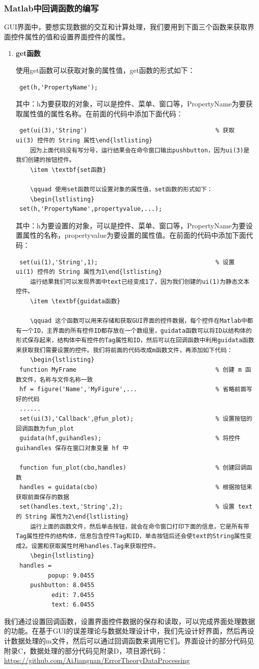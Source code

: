 \subsubsection{Matlab中回调函数的编写}
GUI界面中，要想实现数据的交互和计算处理，我们要用到下面三个函数来获取界面控件属性的值和设置界面控件的属性。
\begin{enumerate}
	\item \textbf{get函数}

	\qquad 使用get函数可以获取对象的属性值，get函数的形式如下：
	\begin{lstlisting}
 get(h,'PropertyName');\end{lstlisting}
 	其中：h为要获取的对象，可以是控件、菜单、窗口等，PropertyName为要获取属性值的属性名称。在前面的代码中添加下面代码：
	 \begin{lstlisting}
 get(ui(3),'String')									% 获取 ui(3) 控件的 String 属性\end{lstlisting}
 	因为上面代码没有写分号，运行结果会在命令窗口输出pushbutton，因为ui(3)是我们创建的按钮控件。
	\item \textbf{set函数}

	\qquad 使用set函数可以设置对象的属性值，set函数的形式如下：
	\begin{lstlisting}
 set(h,'PropertyName',propertyvalue,...);\end{lstlisting}
 	其中：h为要设置的对象，可以是控件、菜单、窗口等，PropertyName为要设置属性的名称，propertyvalue为要设置的属性值。在前面的代码中添加下面代码：
	 \begin{lstlisting}
 set(ui(1),'String',1);									% 设置 ui(1) 控件的 String 属性为1\end{lstlisting}
 	运行结果我们可以发现界面中text已经变成1了，因为我们创建的ui(1)为静态文本控件。
	\item \textbf{guidata函数}

	\qquad 这个函数可以用来存储和获取GUI界面的控件数据，每个控件在Matlab中都有一个ID，主界面的所有控件ID都存放在一个数组里，guidata函数可以将ID以结构体的形式保存起来，结构体中有控件的Tag属性和ID，然后可以在回调函数中利用guidata函数来获取我们需要设置的控件。我们将前面的代码改成m函数文件，再添加如下代码：
	\begin{lstlisting}
 function MyFrame										% 创建 m 函数文件，名称与文件名称一致
 hf = figure('Name','MyFigure',...						% 省略前面写好的代码
 ......
 set(ui(3),'Callback',@fun_plot);						% 设置按钮的回调函数为fun_plot
 guidata(hf,guihandles);								% 将控件 guihandles 保存在窗口对象变量 hf 中

 function fun_plot(cbo,handles)							% 创建回调函数
 handles = guidata(cbo)									% 根据按钮来获取前面保存的数据
 set(handles.text,'String',2);							% 设置 text 的 String 属性为2\end{lstlisting}
 	运行上面的函数文件，然后单击按钮，就会在命令窗口打印下面的信息，它是所有带Tag属性控件的结构体，信息包含控件Tag和ID，单击按钮后还会使text的String属性变成2。设置和获取属性时用handles.Tag来获取控件。
	\begin{lstlisting}
 handles = 
         popup: 9.0455
    pushbutton: 8.0455
          edit: 7.0455
          text: 6.0455\end{lstlisting}
\end{enumerate}

我们通过设置回调函数，设置界面控件数据的保存和读取，可以完成界面处理数据的功能。在基于GUI的误差理论与数据处理设计中，我们先设计好界面，然后再设计数据处理的m文件，然后可以通过回调函数来调用它们。界面设计的部分代码见附录C，数据处理的部分代码见附录D，项目源代码：\url{https://github.com/AiJiangnan/ErrorTheoryDataProcessing}